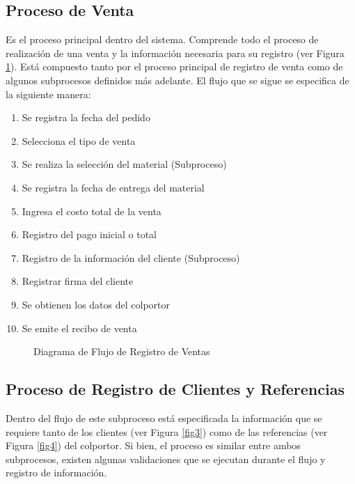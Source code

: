 \documentclass[runningheads]{llncs}
\begin{document}
            \subsection*{Proceso de Venta}
                Es el proceso principal dentro del sistema. Comprende todo el proceso de realización de una venta y la información necesaria para su registro (ver Figura \ref{fig1}).
                Está compuesto tanto por el proceso principal de registro de venta como de algunos subprocesos definidos más adelante.
                El flujo que se sigue se especifica de la siguiente manera:
                \begin{enumerate}
                    \item Se registra la fecha del pedido
                    \item Selecciona el tipo de venta
                    \item Se realiza la selección del material (Subproceso)
                    \item Se registra la fecha de entrega del material
                    \item Ingresa el costo total de la venta
                    \item Registro del pago inicial o total
                    \item Registro de la información del cliente (Subproceso)
                    \item Registrar firma del cliente
                    \item Se obtienen los datos del colportor
                    \item Se emite el recibo de venta
                \end{enumerate}
                \begin{figure}[H]
                    \centering\captionsetup{width=0.8\textwidth}
                    \caption{Diagrama de Flujo de Registro de Ventas} \label{fig1}
                \end{figure}




            \subsection*{Proceso de Registro de Clientes y Referencias}
                Dentro del flujo de este subproceso está especificada la información que se requiere tanto de los clientes (ver Figura \ref{fig3}) como de las referencias (ver Figura \ref{fig4}) del colportor.
                Si bien, el proceso es similar entre ambos subprocesos, existen algunas validaciones que se ejecutan durante el flujo y registro de información.
\end{document}
